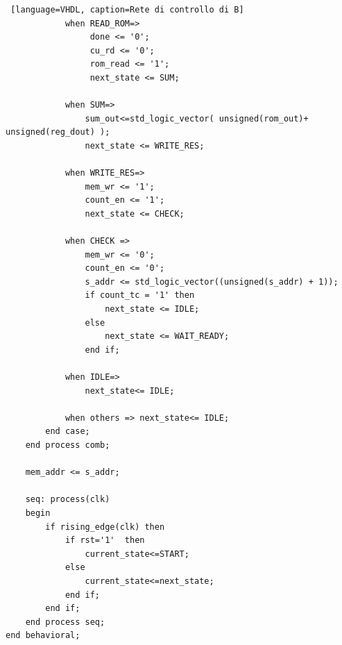 \begin{lstlisting} [language=VHDL, caption=Rete di controllo di B]
            when READ_ROM=>
                 done <= '0';
                 cu_rd <= '0';
                 rom_read <= '1';
                 next_state <= SUM;
                 
            when SUM=>   
                sum_out<=std_logic_vector( unsigned(rom_out)+ unsigned(reg_dout) );
                next_state <= WRITE_RES;
                
            when WRITE_RES=>
                mem_wr <= '1';
                count_en <= '1';
                next_state <= CHECK;
                
            when CHECK =>
                mem_wr <= '0';
                count_en <= '0';
                s_addr <= std_logic_vector((unsigned(s_addr) + 1));
                if count_tc = '1' then
                    next_state <= IDLE;
                else
                    next_state <= WAIT_READY;
                end if;
                     
            when IDLE=>
                next_state<= IDLE;
                
            when others => next_state<= IDLE;
        end case;
    end process comb;

    mem_addr <= s_addr;
    
    seq: process(clk)
    begin
        if rising_edge(clk) then
            if rst='1'  then
                current_state<=START;
            else
                current_state<=next_state;
            end if;
        end if;
    end process seq;
end behavioral;
\end{lstlisting}


